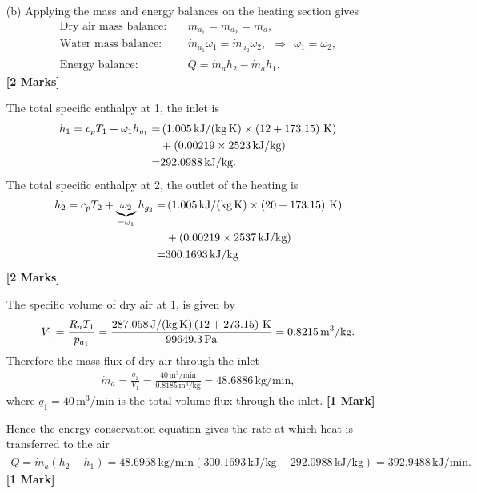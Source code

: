 \documentclass[12pt,twoside]{report}
\begin{document}
\begin{description}
\begin{itemize}
\item[(b)] Applying the mass and energy balances on the heating section gives
\begin{align*}
 \mbox{Dry air mass balance:} &~~~~~ \dot{m}_{a_1} = \dot{m}_{a_2} = \dot{m}_a, \\
 \mbox{Water mass balance:} &~~~~~ \dot{m}_{a_1} \omega_1 = \dot{m}_{a_2} \omega_2, ~~ \Rightarrow ~~ \omega_1 = \omega_2, \\
 \mbox{Energy balance:} &~~~~~ \dot{Q} = \dot{m}_a h_2 - \dot{m}_a h_1.
\end{align*} \hfill \textbf{[2 Marks]}

The total specific enthalpy at 1, the inlet is
\begin{align*}
 h_1 = c_p T_1 + \omega_1 h_{g_1} =& \left(1.005\,\mbox{kJ/(kg\,K)} \times \left(12 + 173.15\right)\,\mbox{K}\right) \nonumber \\
 &+ \left(0.00219 \times 2523\,\mbox{kJ/kg}\right) \nonumber \\
 =& 292.0988\,\mbox{kJ/kg}.
\end{align*}
The total specific enthalpy at 2, the outlet of the heating is
\begin{align*}
 h_2 = c_p T_2 + \underbrace{\omega_2}_{=\omega_1} h_{g_2} =& \left(1.005\,\mbox{kJ/(kg\,K)} \times \left(20 + 173.15\right)\,\mbox{K}\right) \nonumber \\
 &+ \left(0.00219 \times 2537\,\mbox{kJ/kg}\right) \nonumber \\
 =& 300.1693\,\mbox{kJ/kg}
\end{align*} \hfill \textbf{[2 Marks]}

The specific volume of dry air at 1, is given by
\begin{align*}
 V_1 = \frac{R_a T_1}{p_{a_1}} = \frac{287.058\,\mbox{J/(kg\,K)} \left(12 + 273.15\right)\,\mbox{K}}{99649.3\,\mbox{Pa}} = 0.8215\,\mbox{m}^3\mbox{/kg}.
\end{align*}
Therefore the mass flux of dry air through the inlet
\begin{align*}
 \dot{m}_a = \frac{q_1}{V_1} = \frac{40\,\mbox{m}^3\mbox{/min}}{0.8185\,\mbox{m}^3\mbox{/kg}} = 48.6886\,\mbox{kg/min},
\end{align*}
where $q_1 = 40$\,m$^3$/min is the total volume flux through the inlet. \hfill \textbf{[1 Mark]}

Hence the energy conservation equation gives the rate at which heat is transferred to the air
\begin{align*}
 \dot{Q} = \dot{m}_a \left(h_2 - h_1\right) = 48.6958\,\mbox{kg/min} \left(300.1693\,\mbox{kJ/kg} - 292.0988\,\mbox{kJ/kg}\right) = 392.9488\,\mbox{kJ/min}.
\end{align*} \hfill \textbf{[1 Mark]}



\end{itemize}
\end{description}
\end{document}

